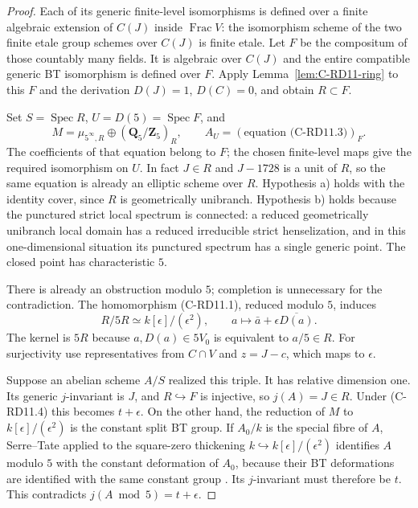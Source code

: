\begin{proof}
Each of its generic finite-level isomorphisms is defined over a
finite algebraic extension of $C(J)$ inside $\operatorname{Frac}V$:
the isomorphism scheme of the two finite etale group schemes over
$C(J)$ is finite etale. Let $F$ be the compositum of those countably
many fields. It is algebraic over $C(J)$ and the entire compatible
generic BT isomorphism is defined over $F$. Apply
Lemma~\ref{lem:C-RD11-ring} to this $F$ and the derivation $D(J)=1$,
$D(C)=0$, and obtain $R\subset F$.

Set $S=\operatorname{Spec}R$, $U=D(5)=\operatorname{Spec}F$, and
\[
 M=\mu_{5^\infty,R}\oplus(\mathbf Q_5/\mathbf Z_5)_R,
 \qquad A_U=(\text{equation (C-RD11.3)})_F.
\]
The coefficients of that equation belong to $F$; the chosen finite-level maps give the
required isomorphism on $U$. In fact $J\in R$ and $J-1728$ is a unit
of $R$, so the same equation is already an elliptic scheme over $R$.
Hypothesis a) holds with the identity cover, since $R$ is geometrically
unibranch. Hypothesis b) holds because the punctured strict local
spectrum is connected: a reduced geometrically unibranch local
domain has a reduced irreducible strict henselization, and in this
one-dimensional situation its punctured spectrum has a single
generic point. The closed point has characteristic $5$.

There is already an obstruction modulo $5$; completion is unnecessary
for the contradiction. The homomorphism (C-RD11.1), reduced modulo
$5$, induces
\[
 R/5R\simeq k[\epsilon]/(\epsilon^2),\qquad
 a\longmapsto\bar a+\epsilon\overline{D(a)}.            \tag{C-RD11.4}
\]
The kernel is $5R$ because $a,D(a)\in5V_0$ is equivalent to $a/5\in R$.
For surjectivity use representatives from $C\cap V$ and $z=J-c$,
which maps to $\epsilon$.

Suppose an abelian scheme $A/S$ realized this triple. It has relative
dimension one. Its generic $j$-invariant is $J$, and $R\hookrightarrow F$
is injective, so $j(A)=J\in R$. Under (C-RD11.4) this becomes
$t+\epsilon$. On the other hand, the reduction of $M$ to
$k[\epsilon]/(\epsilon^2)$ is the constant split BT group. If $A_0/k$
is the special fibre of $A$, Serre--Tate applied to the square-zero
thickening $k\hookrightarrow k[\epsilon]/(\epsilon^2)$ identifies
$A$ modulo $5$ with the constant deformation of $A_0$, because their
BT deformations are identified with the same constant group
\cite[Theorem~1.2.1]{Katz1981SerreTate}. Its $j$-invariant must
therefore be $t$. This contradicts $j(A\bmod5)=t+\epsilon$.
\end{proof}


